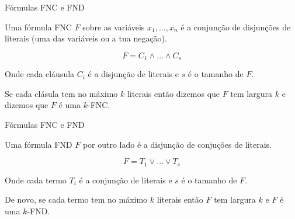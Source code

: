 \documentclass[landscape, 9pt]{beamer}
\begin{document}

\begin{frame}

\titlepage

\end{frame}


\begin{frame}{Fórmulas FNC e FND}

Uma fórmula FNC $F$ sobre as variáveis $x_{1}, \dots, x_{n}$ é a conjunção de disjunções de literais (uma das variáveis ou a tua negação).

\begin{equation*}
	F = C_{1} \land \dots \land C_{s}
\end{equation*}

Onde cada cláusula $C_{i}$ é a disjunção de literais e $s$ é o tamanho de $F$.

Se cada clásula tem no máximo $k$ literais então dizemos que $F$ tem largura $k$ e dizemos que $F$ é uma $k$-FNC.

\end{frame}


\begin{frame}{Fórmulas FNC e FND}

Uma fórmula FND $F$ por outro lado é a disjunção de conjuções de literais.

\begin{equation*}
	F = T_{1} \lor \dots \lor T_{s}
\end{equation*}

Onde cada termo $T_{i}$ é a conjunção de literais e $s$ é o tamanho de $F$.

De novo, se cada termo tem no máximo $k$ literais então $F$ tem largura $k$ e $F$ é uma $k$-FND.

\end{frame}

\end{document}
